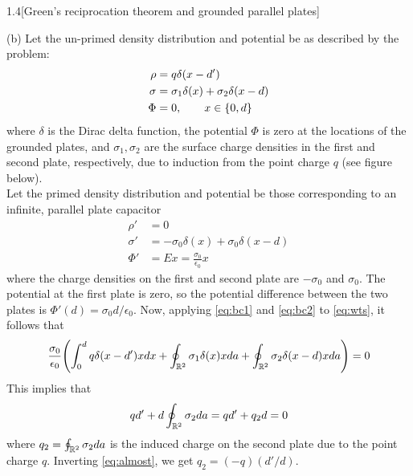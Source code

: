 \documentclass[12pt]{article}
\begin{document}
\begin{problem}{1.4}[Green's reciprocation theorem and grounded
    parallel plates]
\begin{solution}
    (b) Let the un-primed density distribution and potential be as described by
    the problem:
    \begin{subequations}\label{eq:bc1}
        \begin{align}
            \rho&=q\delta(x-d')\\
            \sigma&=\sigma_1\delta(x)+\sigma_2\delta(x-d)\\
            \Phi&=0,\qquad x\in\qty{0,d}
        \end{align} 
    \end{subequations}
    where $\delta$ is the Dirac delta function, the potential $\Phi$ is zero
    at the locations of the grounded plates, and $\sigma_1,\sigma_2$ are
    the surface charge densities in the first and second plate, respectively, 
    due to induction from the point charge $q$ (see figure below).\\[2in]

    Let the primed density distribution and potential be those corresponding to 
    an infinite, parallel plate capacitor
    \begin{subequations}\label{eq:bc2}
        \begin{align}
            \rho'&=0\\
            \sigma'&=-\sigma_0\delta(x)+\sigma_0\delta(x-d)\\
            \Phi'&=Ex=\frac{\sigma_0}{\epsilon_0}x
        \end{align} 
    \end{subequations}
    where the charge densities on the first and second plate are $-\sigma_0$ and
    $\sigma_0$. The potential at the first plate is zero, so the potential
    difference between the two plates is $\Phi'(d)=\sigma_0 d/\epsilon_0$.
    Now, applying \eqref{eq:bc1} and \eqref{eq:bc2} to \eqref{eq:wts}, it 
    follows that
    \begin{equation}
        \frac{\sigma_0}{\epsilon_0}\qty(\int_0^d q\delta(x-d')xdx
        +\oint_{\mathbb{R}^2}\sigma_1\delta(x)x da
        +\oint_{\mathbb{R}^2}\sigma_2\delta(x-d)xda)=0
    \end{equation}
    This implies that
    \begin{equation}\label{eq:almost}
        qd'+d\oint_{\mathbb{R}^2}\sigma_2da=qd'+q_2d=0
    \end{equation}
    where $q_2=\oint_{\mathbb{R}^2}\sigma_2da$ is the induced charge on the
    second plate due to the point charge $q$. Inverting \eqref{eq:almost}, we 
    get $q_2=(-q)(d'/d)$.
\end{solution}
    
\end{problem}
\end{document}
